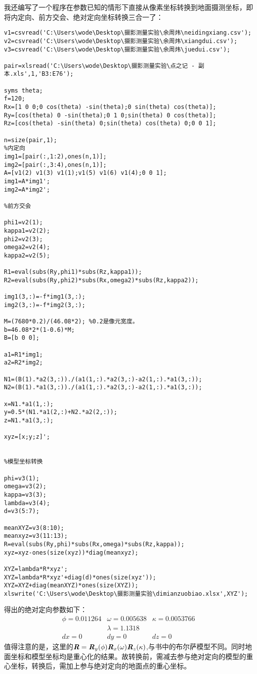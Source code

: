 我还编写了一个程序在参数已知的情形下直接从像素坐标转换到地面摄测坐标，即将内定向、前方交会、绝对定向坐标转换三合一了：
\begin{lstlisting}[caption=transform.m]
v1=csvread('C:\Users\wode\Desktop\摄影测量实验\余周炜\neidingxiang.csv');
v2=csvread('C:\Users\wode\Desktop\摄影测量实验\余周炜\xiangdui.csv');
v3=csvread('C:\Users\wode\Desktop\摄影测量实验\余周炜\juedui.csv');

pair=xlsread('C:\Users\wode\Desktop\摄影测量实验\点之记 - 副本.xls',1,'B3:E76');

syms theta;
f=120;
Rx=[1 0 0;0 cos(theta) -sin(theta);0 sin(theta) cos(theta)];
Ry=[cos(theta) 0 -sin(theta);0 1 0;sin(theta) 0 cos(theta)];
Rz=[cos(theta) -sin(theta) 0;sin(theta) cos(theta) 0;0 0 1];

n=size(pair,1);
%内定向
img1=[pair(:,1:2),ones(n,1)];
img2=[pair(:,3:4),ones(n,1)];
A=[v1(2) v1(3) v1(1);v1(5) v1(6) v1(4);0 0 1];
img1=A*img1';
img2=A*img2';

%前方交会

phi1=v2(1);
kappa1=v2(2);
phi2=v2(3);
omega2=v2(4);
kappa2=v2(5);

R1=eval(subs(Ry,phi1)*subs(Rz,kappa1));
R2=eval(subs(Ry,phi2)*subs(Rx,omega2)*subs(Rz,kappa2));

img1(3,:)=-f*img1(3,:);
img2(3,:)=-f*img2(3,:);

M=(7680*0.2)/(46.08*2); %0.2是像元宽度。
b=46.08*2*(1-0.6)*M;
B=[b 0 0];

a1=R1*img1;
a2=R2*img2;

N1=(B(1).*a2(3,:))./(a1(1,:).*a2(3,:)-a2(1,:).*a1(3,:));
N2=(B(1).*a1(3,:))./(a1(1,:).*a2(3,:)-a2(1,:).*a1(3,:));

x=N1.*a1(1,:);
y=0.5*(N1.*a1(2,:)+N2.*a2(2,:));
z=N1.*a1(3,:);

xyz=[x;y;z]';


%模型坐标转换

phi=v3(1);
omega=v3(2);
kappa=v3(3);
lambda=v3(4);
d=v3(5:7);

meanXYZ=v3(8:10);
meanxyz=v3(11:13);
R=eval(subs(Ry,phi)*subs(Rx,omega)*subs(Rz,kappa));
xyz=xyz-ones(size(xyz))*diag(meanxyz);

XYZ=lambda*R*xyz';
XYZ=lambda*R*xyz'+diag(d)*ones(size(xyz'));
XYZ=XYZ+diag(meanXYZ)*ones(size(XYZ));
xlswrite('C:\Users\wode\Desktop\摄影测量实验\dimianzuobiao.xlsx',XYZ');
\end{lstlisting}

得出的绝对定向参数如下：
\begin{equation}
\begin{array}{lll}
\phi=0.011264 & \omega=0.005638 & \kappa=0.0053766 \\
& \lambda=1.1318 & \\
dx=0 & dy=0 & dz=0  
\end{array}
\end{equation}
值得注意的是，这里的$\boldsymbol{\mathit{R}}=\boldsymbol{\mathit{R}}_y(\phi)\boldsymbol{\mathit{R}}_x(\omega)\boldsymbol{\mathit{R}}_z(\kappa)$,与书中的布尔萨模型不同。同时地面坐标和模型坐标均是重心化的结果。故转换前，需减去参与绝对定向的模型的重心坐标，转换后，需加上参与绝对定向的地面点的重心坐标。

